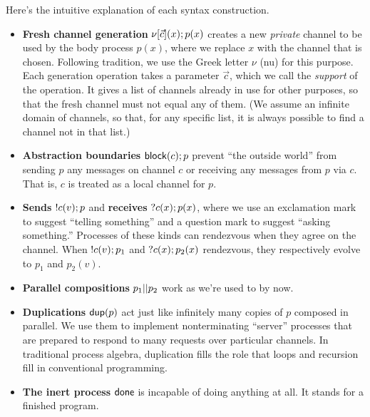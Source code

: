 \documentclass{amsbook}
\theoremstyle{definition}
\theoremstyle{remark}
\numberwithin{section}{chapter}
\numberwithin{equation}{chapter}
\begin{document}
Here's the intuitive explanation of each syntax construction.
\begin{itemize}
  \item \textbf{Fresh channel generation} $\nu[\vec{c}](x); p(x)$ creates a new \emph{private} channel to be used by the body process $p(x)$, where we replace $x$ with the channel that is chosen.  Following tradition, we use the Greek letter $\nu$\index{$\nu$} (nu) for this purpose.  Each generation operation takes a parameter $\vec{c}$, which we call the \emph{support} of the operation.  It gives a list of channels already in use for other purposes, so that the fresh channel must not equal any of them.  (We assume an infinite domain of channels, so that, for any specific list, it is always possible to find a channel not in that list.)

  \item \textbf{Abstraction boundaries} $\mathsf{block}(c); p$ prevent ``the outside world'' from sending $p$ any messages on channel $c$ or receiving any messages from $p$ via $c$.  That is, $c$ is treated as a local channel for $p$.
\abstraction

  \item \textbf{Sends} $!c(v); p$ and \textbf{receives} $?c(x); p(x)$, where we use an exclamation mark to suggest ``telling something'' and a question mark to suggest ``asking something.''  Processes of these kinds can rendezvous when they agree on the channel.  When $!c(v); p_1$ and $?c(x); p_2(x)$ rendezvous, they respectively evolve to $p_1$ and $p_2(v)$.

  \item \textbf{Parallel compositions} $p_1 || p_2$ work as we're used to by now.

  \item \textbf{Duplications} $\mathsf{dup}(p)$ act just like infinitely many copies of $p$ composed in parallel.  We use them to implement nonterminating ``server'' processes that are prepared to respond to many requests over particular channels.  In traditional process algebra, duplication fills the role that loops and recursion fill in conventional programming.

  \item \textbf{The inert process} $\mathsf{done}$ is incapable of doing anything at all.  It stands for a finished program.
\end{itemize}
\end{document}
